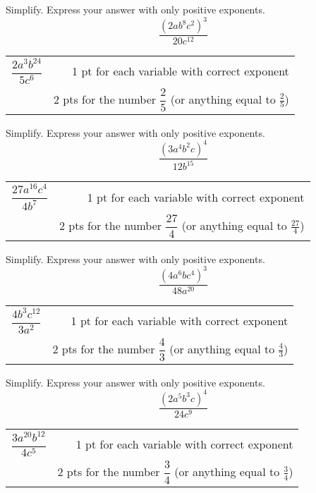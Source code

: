 {
	Simplify.  Express your answer with only positive exponents.  $$\dfrac{(2ab^8c^2)^3}{20c^{12}}$$
}
{
	\begin{tabular}{l r}
	$\dfrac{2a^3b^{24}}{5c^6}$ &   1 pt for each variable with correct exponent \\
	& 2 pts for the number $\dfrac{2}{5}$ (or anything equal to $\frac{2}{5}$)
	\end{tabular}
}

{
	Simplify.  Express your answer with only positive exponents.  $$\dfrac{(3a^4b^2c)^4}{12b^{15}}$$
}
{
	\begin{tabular}{l r}
	$\dfrac{27a^{16}c^{4}}{4b^7}$ &   1 pt for each variable with correct exponent \\
	& 2 pts for the number $\dfrac{27}{4}$ (or anything equal to $\frac{27}{4}$)
	\end{tabular}
}

{
	Simplify.  Express your answer with only positive exponents.  $$\dfrac{(4a^6bc^4)^3}{48a^{20}}$$
}
{
	\begin{tabular}{l r}
	$\dfrac{4b^{3}c^{12}}{3a^2}$ &   1 pt for each variable with correct exponent \\
	& 2 pts for the number $\dfrac{4}{3}$ (or anything equal to $\frac{4}{3}$)
	\end{tabular}

}

{
	Simplify.  Express your answer with only positive exponents.  $$\dfrac{(2a^5b^3c)^4}{24c^{9}}$$
}
{
	\begin{tabular}{l r}
	$\dfrac{3a^{20}b^{12}}{4c^5}$ &   1 pt for each variable with correct exponent \\
	& 2 pts for the number $\dfrac{3}{4}$ (or anything equal to $\frac{3}{4}$)
	\end{tabular}
}

